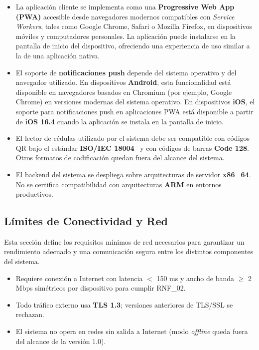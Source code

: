 \begin{itemize}

\item La aplicación cliente se implementa como una \textbf{Progressive Web App (PWA)} accesible desde navegadores modernos compatibles con \textit{Service Workers}, tales como Google Chrome, Safari o Mozilla Firefox, en dispositivos móviles y computadores personales. La aplicación puede instalarse en la pantalla de inicio del dispositivo, ofreciendo una experiencia de uso similar a la de una aplicación nativa.

\item El soporte de \textbf{notificaciones push} depende del sistema operativo y del navegador utilizado. En dispositivos \textbf{Android}, esta funcionalidad está disponible en navegadores basados en Chromium (por ejemplo, Google Chrome) en versiones modernas del sistema operativo. En dispositivos \textbf{iOS}, el soporte para notificaciones push en aplicaciones PWA está disponible a partir de \textbf{iOS 16.4} cuando la aplicación se instala en la pantalla de inicio.

\item El lector de cédulas utilizado por el sistema debe ser compatible con códigos QR bajo el estándar \textbf{ISO/IEC 18004}~\cite{iso18004} y con códigos de barras \textbf{Code 128}. Otros formatos de codificación quedan fuera del alcance del sistema.

\item El backend del sistema se despliega sobre arquitecturas de servidor \textbf{x86\_64}. No se certifica compatibilidad con arquitecturas \textbf{ARM} en entornos productivos.

\end{itemize}

\subsection{Límites de Conectividad y Red}
Esta sección define los requisitos mínimos de red necesarios para garantizar un rendimiento adecuado y una comunicación segura entre los distintos componentes del sistema.

\begin{itemize}
    \item Requiere conexión a Internet con latencia \(<\) 150 ms y ancho de banda \(\ge\) 2 Mbps simétricos por dispositivo para cumplir RNF\_02.
    \item Todo tráfico externo usa \textbf{TLS 1.3}; versiones anteriores de TLS/SSL se rechazan.
    \item El sistema no opera en redes sin salida a Internet (modo \textit{offline} queda fuera del alcance de la versión 1.0).
\end{itemize}

